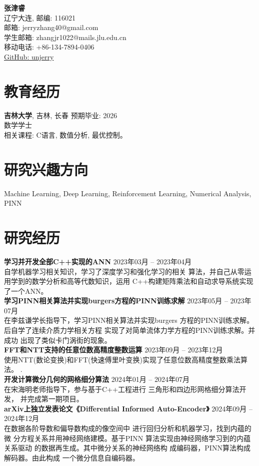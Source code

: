 \documentclass[a4paper,10pt]{article}
\begin{document}
\begin{center}
    {\LARGE \textbf{张津睿}}\\
    辽宁大连, 邮编: 116021 \\
    邮箱: jerryzhang40@gmail.com \\
    学生邮箱: zhangjr1022@mails.jlu.edu.cn \\
    移动电话: +86-134-7894-0406 \\
    \href{https://github.com/unjerry}{GitHub: unjerry}
\end{center}

\section*{教育经历}
\textbf{吉林大学}, 吉林, 长春  \hfill 预期毕业: 2026  \\
数学学士 \\
相关课程: C语言, 数值分析, 最优控制。

\section*{研究兴趣方向}
Machine Learning, Deep Learning, Reinforcement Learning, Numerical Analysis, PINN \\


\section*{研究经历}
\textbf{学习并开发全部C++实现的ANN}
\hfill 2023年03月 – 2023年04月\\
自学机器学习相关知识，学习了深度学习和强化学习的相关
算法，并自己从零运用学到的数学分析和高等代数知识，运用
C++构建矩阵乘法和自动求导系统实现了一个ANN\cite{firstApproachANN}。
\\
\textbf{学习PINN相关算法并实现burgers方程的PINN训练求解}
\hfill 2023年05月 – 2023年07月\\
在李兹谦学长指导下，学习PINN相关算法并实现burgers
方程的PINN训练求解\cite[PINNwork2]{PINNwork2}。后自学了连续介质力学相关方程
实现了对简单流体力学方程的PINN训练求解。并成功
出现了类似卡门涡街的现象\cite[PINNwork1]{PINNwork1}。
\\
\textbf{FFT和NTT支持的任意位数高精度整数运算}
\hfill 2023年09月 – 2023年12月\\
使用NTT(数论变换)和FFT(快速傅里叶变换)实现了任意位数高精度整数乘法算法。
\cite{NTT_ingeterfastmultiplication}.
\\
\textbf{开发计算微分几何的网格细分算法}
\hfill 2024年01月 – 2024年07月\\
在宋海明老师指导下，参与基于C++工程进行
三角形和四边形网格细分算法开发，
并完成第一期项目。
\\
\textbf{arXiv上独立发表论文《Differential Informed Auto-Encoder》}
\hfill 2024年09月 – 2024年12月\\
在数据各阶导数和偏导数构成的像空间中
进行回归分析和机器学习，找到内蕴的微
分方程关系并用神经网络建模。基于PINN
算法实现由神经网络学习到的内蕴关系驱动
的数据再生成。其中微分关系的神经网络构
成编码器，PINN算法构成解码器。由此构成
一个微分信息自编码器。
\cite{zhang2024differentialinformedautoencoder}
\end{document}
